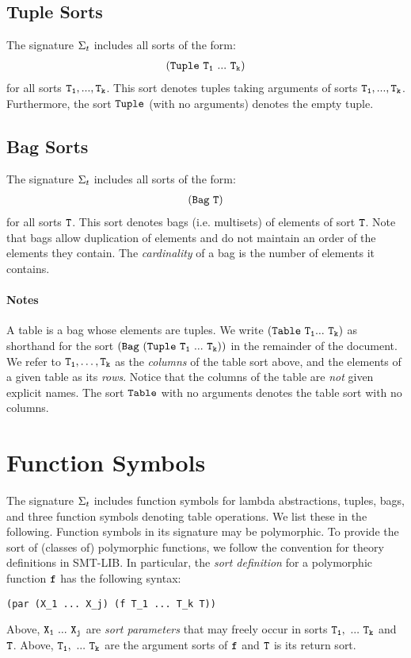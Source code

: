 \documentclass[english,a4paper,10pt]{article}
\begin{document}
\subsection{Tuple Sorts}

The signature $\Sigma_{t}$ includes all sorts of the form:
\begin{align*}
{\tt  (Tuple\ T_1\ ...\ T_k) }
\end{align*}
for all sorts ${\tt T_1, ..., T_k}$.
This sort denotes tuples taking arguments of sorts ${\tt T_1, ..., T_k}$.
Furthermore, the sort ${\tt Tuple}$ (with no arguments) denotes
the empty tuple.

\subsection{Bag Sorts}
The signature $\Sigma_{t}$ includes all sorts of the form:
\begin{align*}
{\tt  (Bag\ T) }
\end{align*}
for all sorts ${\tt T}$. 
This sort denotes bags (i.e. multisets) of elements of sort ${\tt T}$.
Note that bags allow duplication of elements and do not maintain an order
of the elements they contain.
The \emph{cardinality} of a bag is the number of elements it contains.

\paragraph{Notes}
A table is a bag whose elements are tuples.
We write ${\tt  (Table\ T_1 ...\ T_k)}$ as shorthand for 
the sort $\syntax{ (Bag\ (Tuple\ T_1\ ...\ T_k)) }$ 
in the remainder of the document.
We refer to ${\tt T_1}, \ldots, {\tt T_k}$ as the \emph{columns} of the table sort above,
and the elements of a given table as its \emph{rows}.
Notice that the columns of the table are \emph{not} given explicit names.
The sort ${\tt Table}$ with no arguments denotes the table sort with
no columns.

\section{Function Symbols}

The signature $\Sigma_{t}$ includes function symbols for
lambda abstractions,
tuples, bags, and
three function symbols denoting table operations.
We list these in the following.
Function symbols in its signature may be polymorphic.
To provide the sort of (classes of) polymorphic functions,
we follow the convention for theory definitions in SMT-LIB. %
In particular, the \emph{sort definition} for a polymorphic function ${\tt f}$
has the following syntax:
\begin{verbatim}
(par (X_1 ... X_j) (f T_1 ... T_k T))
\end{verbatim}
Above, ${\tt X_1\ ...\ X_j}$ are \emph{sort parameters}
that may freely occur in sorts ${\tt T_1,\ ...\ T_k}$ and ${\tt T}$.
Above, ${\tt T_1,\ ...\ T_k}$ are the argument sorts of ${\tt f}$
and ${\tt T}$ is its return sort.
\end{document}

